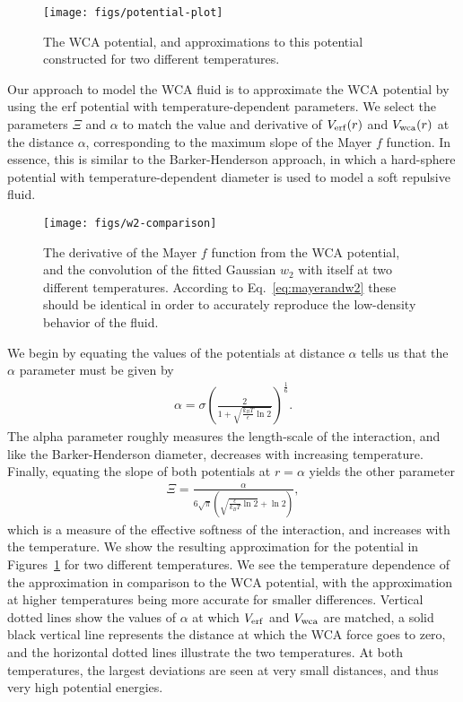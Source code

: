 \documentclass[letterpaper,twocolumn,amsmath,amssymb,prb]{revtex4-1}
\begin{document}
\begin{figure}
\begin{center}
\texttt{[image: figs/potential-plot]}
\end{center}
\caption{The WCA potential, and approximations to this potential
  constructed for two different temperatures.}
\label{fig:potential-plot}
\end{figure}

Our approach to model the WCA fluid is to approximate the WCA
potential by using the erf potential with temperature-dependent
parameters.  We select the parameters $\Xi$ and $\alpha$ to match the
value and derivative of $V_{\mathrm{erf}}(r)$ and $V_{\mathrm{wca}}(r)$ at the distance
$\alpha$, corresponding to the maximum slope of the Mayer $f$
function.  In essence, this is similar to the Barker-Henderson
approach, in which a hard-sphere potential with temperature-dependent
diameter is used to model a soft repulsive fluid.

\begin{figure}
\begin{center}
\texttt{[image: figs/w2-comparison]}
\end{center}
\caption{The derivative of the Mayer $f$ function from the WCA
  potential, and the convolution of the fitted Gaussian $w_2$ with
  itself at two different temperatures.  According to
  Eq.~\ref{eq:mayerandw2} these should be identical in order to
  accurately reproduce the low-density behavior of the fluid.}
\label{fig:w2-comparison}
\end{figure}

We begin by equating the values of the potentials at distance $\alpha$
tells us that the $\alpha$ parameter must be given by
\begin{align}
  \alpha = \sigma \left( \frac{2}{1 + \sqrt{\frac{k_BT}{\epsilon}
        \ln 2}} \right)^{\frac{1}{6}}.
\end{align}
The alpha parameter roughly measures the length-scale of the
interaction, and like the Barker-Henderson diameter, decreases with
increasing temperature.  Finally, equating the slope of both
potentials at $r = \alpha$ yields the other parameter
\begin{align}
  \Xi = \frac{\alpha}{6\sqrt{\pi} \left( \sqrt{\frac{\epsilon}{k_BT} \ln
      2} + \ln 2 \right)},
\end{align}
which is a measure of the effective softness of the interaction, and
increases with the temperature.  We show the resulting approximation
for the potential in Figures~\ref{fig:potential-plot} for two
different temperatures.  We see the temperature dependence of the
approximation in comparison to the WCA potential, with the
approximation at higher temperatures being more accurate for smaller
differences. Vertical dotted lines show the values of $\alpha$ at
which $V_{\mathrm{erf}}$ and $V_{\mathrm{wca}}$ are matched, a solid black vertical line
represents the distance at which the WCA force goes to zero, and the
horizontal dotted lines illustrate the two temperatures.  At both
temperatures, the largest deviations are seen at very small distances,
and thus very high potential energies.
\end{document}
